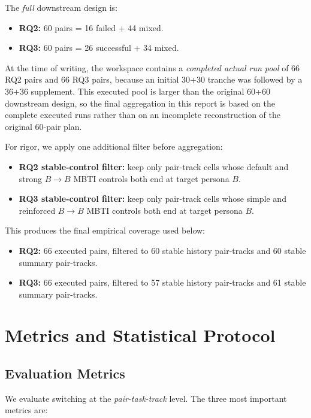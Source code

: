 \documentclass[11pt]{article}
\begin{document}
The \emph{full} downstream design is:
\begin{itemize}[leftmargin=*]
    \item \textbf{RQ2:} 60 pairs = 16 failed + 44 mixed.
    \item \textbf{RQ3:} 60 pairs = 26 successful + 34 mixed.
\end{itemize}

At the time of writing, the workspace contains a \emph{completed actual run pool} of 66 RQ2 pairs and 66 RQ3 pairs, because an initial 30+30 tranche was followed by a 36+36 supplement.
This executed pool is larger than the original 60+60 downstream design, so the final aggregation in this report is based on the complete executed runs rather than on an incomplete reconstruction of the original 60-pair plan.

For rigor, we apply one additional filter before aggregation:
\begin{itemize}[leftmargin=*]
    \item \textbf{RQ2 stable-control filter:} keep only pair-track cells whose default and strong $B \rightarrow B$ MBTI controls both end at target persona $B$.
    \item \textbf{RQ3 stable-control filter:} keep only pair-track cells whose simple and reinforced $B \rightarrow B$ MBTI controls both end at target persona $B$.
\end{itemize}

This produces the final empirical coverage used below:
\begin{itemize}[leftmargin=*]
    \item \textbf{RQ2:} 66 executed pairs, filtered to 60 stable history pair-tracks and 60 stable summary pair-tracks.
    \item \textbf{RQ3:} 66 executed pairs, filtered to 57 stable history pair-tracks and 61 stable summary pair-tracks.
\end{itemize}

\section{Metrics and Statistical Protocol}

\subsection{Evaluation Metrics}

We evaluate switching at the \emph{pair-task-track} level.
The three most important metrics are:
\end{document}
